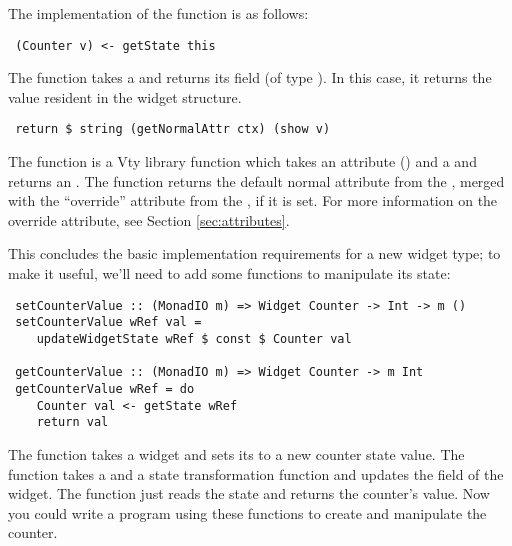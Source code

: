 The implementation of the  function is as follows:

\begin{verbatim}
 (Counter v) <- getState this
\end{verbatim}

The  function takes a  and returns its
 field (of type ).  In this case, it returns the
 value resident in the widget structure.

\begin{verbatim}
 return $ string (getNormalAttr ctx) (show v)
\end{verbatim}

The  function is a Vty library function which takes an
attribute () and a  and returns an .
The  function returns the default normal attribute
from the , merged with the ``override'' attribute
from the , if it is set.  For more information on
the override attribute, see Section \vref{sec:attributes}.

This concludes the basic implementation requirements for a new widget
type; to make it useful, we'll need to add some functions to
manipulate its state:

\begin{verbatim}
 setCounterValue :: (MonadIO m) => Widget Counter -> Int -> m ()
 setCounterValue wRef val =
    updateWidgetState wRef $ const $ Counter val

 getCounterValue :: (MonadIO m) => Widget Counter -> m Int
 getCounterValue wRef = do
    Counter val <- getState wRef
    return val
\end{verbatim}

The  function takes a  widget and sets
its  to a new counter state value.  The
 function takes a  and a state
transformation function and updates the  field of the
widget.  The  function just reads the state and
returns the counter's value.  Now you could write a program using
these functions to create and manipulate the counter.
